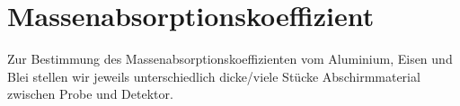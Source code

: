 \section{Massenabsorptionskoeffizient}

Zur Bestimmung des Massenabsorptionskoeffizienten vom Aluminium, Eisen und Blei stellen wir jeweils 
unterschiedlich dicke/viele Stücke Abschirmmaterial zwischen Probe und Detektor. 